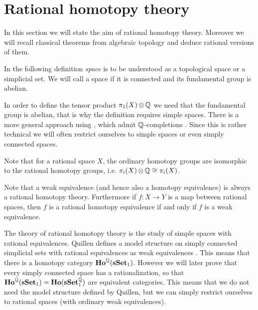 
\chapter{Rational homotopy theory}
\label{sec:basics}

In this section we will state the aim of rational homotopy theory. Moreover we will recall classical theorems from algebraic topology and deduce rational versions of them.

In the following definition \emph{space} is to be understood as a topological space or a simplicial set. We will call a space  if it is connected and its fundamental group is abelian.



In order to define the tensor product $\pi_1(X) \operatorname*{\otimes} \mathbb{Q}$ we need that the fundamental group is abelian, that is why the definition requires simple spaces. There is a more general approach using , which admit $\mathbb{Q}$-completions \cite{bousfield}. Since this is rather technical we will often restrict ourselves to simple spaces or even simply connected spaces.

Note that for a rational space $X$, the ordinary homotopy groups are isomorphic to the rational homotopy groups, i.e. $\pi_i(X) \operatorname*{\otimes} \mathbb{Q} \cong \pi_i(X)$.



Note that a weak equivalence (and hence also a homotopy equivalence) is always a rational homotopy theory. Furthermore if $f: X \to Y$ is a map between rational spaces, then $f$ is a rational homotopy equivalence if and only if $f$ is a weak equivalence.

The theory of rational homotopy theory is the study of simple spaces with rational equivalences. Quillen defines a model structure on simply connected simplicial sets with rational equivalences as weak equivalences \cite{quillen}. This means that there is a homotopy category $\mathbf{Ho}^{\mathbb{Q}}(\mathbf{s{\mathbf{Set}}}_1)$. However we will later prove that every simply connected space has a rationalization, so that $\mathbf{Ho}^{\mathbb{Q}}(\mathbf{s{\mathbf{Set}}}_1) = \mathbf{Ho}(\mathbf{s{\mathbf{Set}}}^{\mathbb{Q}}_1)$ are equivalent categories. This means that we do not need the model structure defined by Quillen, but we can simply restrict ourselves to rational spaces (with ordinary weak equivalences).


